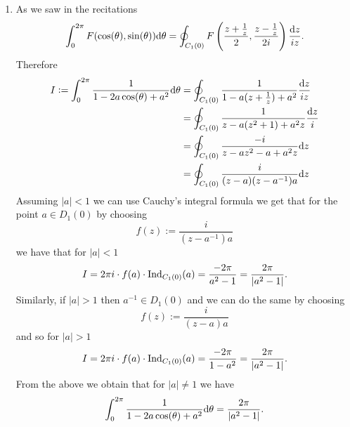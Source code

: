 \documentclass[11pt,a4paper]{article}
\begin{document}
\begin{solution}
\begin{enumerate}
\[    \]
    and
    \[
      \oint_{C_2(3i)} \frac{e^{z^2}}{z^3 (z^2 + 4)^2} \dz =
      2 \pi i \del{0 + \frac{3}{64 e^4} + 0} = \frac{3 \pi i }{32 e^4}.
    \]
  \item[(2)] As we saw in the recitations
    \[
      \int_{0}^{2 \pi} F(\cos(\theta), \sin(\theta)) \dtheta =
      \oint_{C_1(0)}
      F\del{\frac{z + \frac{1}{z}}{2},\frac{z - \frac{1}{z}}{2i}}
      \frac{\dz}{i z}.
    \]
    Therefore
    \begin{align*}
      I := \int_{0}^{2 \pi} \frac{1}{1 - 2a \cos(\theta) + a^2} \mathrm{d} \theta &=
      \oint_{C_1(0)} \frac{1}{1 - a (z + \frac{1}{z}) + a^2}
      \frac{\mathrm{d} z}{i z} \\ &=
      \oint_{C_1(0)} \frac{1}{z - a (z^2 + 1) + a^2 z}
      \frac{\mathrm{d} z}{i} \\ &=
      \oint_{C_1(0)} \frac{-i}{z - a z^2 - a + a^2 z} \mathrm{d} z \\ &=
      \oint_{C_1(0)} \frac{i}{(z - a)(z - a^{-1}) a} \mathrm{d} z
    \end{align*}
    Assuming $|a| < 1$ we can use Cauchy's integral formula we get that for
    the point $a \in D_1(0)$ by choosing
    \[
      f(z) := \frac{i}{(z - a^{-1}) a}
    \]
    we have that for $|a| < 1$
    \[
      I = 2 \pi i \cdot f(a) \cdot \operatorname{Ind}_{C_1(0)}(a) =
      \frac{- 2 \pi}{a^2 - 1} =
      \frac{2 \pi}{\left\lvert a^2 - 1\right\rvert}.
    \]
    Similarly, if $|a| > 1$ then $a^{-1} \in D_1(0)$ and we can do the same
    by choosing
    \[
      f(z) := \frac{i}{(z - a) a}
    \]
    and so for $|a| > 1$
    \[
      I = 2 \pi i \cdot f(a) \cdot \operatorname{Ind}_{C_1(0)}(a) =
      \frac{- 2 \pi}{1 - a^2} =
      \frac{2 \pi}{\left\lvert a^2 - 1\right\rvert}.
    \]
    From the above we obtain that for $|a| \neq 1$ we have
    \[
      \int_{0}^{2 \pi} \frac{1}{1 - 2a \cos(\theta) + a^2} \mathrm{d} \theta =
      \frac{2 \pi}{\left\lvert a^2 - 1\right\rvert}.
    \]
\end{enumerate}
\end{solution}
\end{document}
